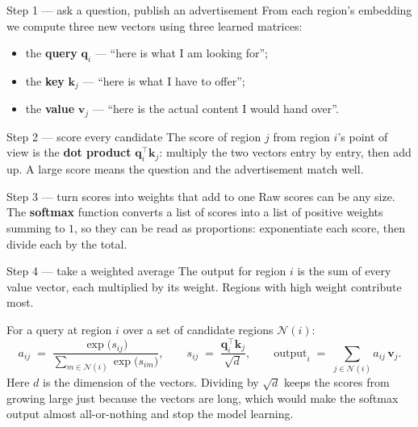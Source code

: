 \documentclass[11pt,a4paper]{article}
\newcommand{\qvec}[1]{\mathbf{q}_{#1}}
\newcommand{\kvec}[1]{\mathbf{k}_{#1}}
\newcommand{\vvec}[1]{\mathbf{v}_{#1}}
\newcommand{\term}[1]{\textcolor{deepblue}{\textbf{#1}}}
\begin{document}
\begin{stepbox}{Step 1 --- ask a question, publish an advertisement}
From each region's embedding we compute three new vectors using three learned
matrices:
\begin{itemize}
\item the \term{query} $\qvec{i}$ --- ``here is what I am looking for'';
\item the \term{key} $\kvec{j}$ --- ``here is what I have to offer'';
\item the \term{value} $\vvec{j}$ --- ``here is the actual content I would hand over''.
\end{itemize}
\end{stepbox}

\begin{stepbox}{Step 2 --- score every candidate}
The score of region $j$ from region $i$'s point of view is the \term{dot product}
$\qvec{i}^\top \kvec{j}$: multiply the two vectors entry by entry, then add up. A
large score means the question and the advertisement match well.
\end{stepbox}

\begin{stepbox}{Step 3 --- turn scores into weights that add to one}
Raw scores can be any size. The \term{softmax} function converts a list of scores
into a list of positive weights summing to $1$, so they can be read as
proportions: exponentiate each score, then divide each by the total.
\end{stepbox}

\begin{stepbox}{Step 4 --- take a weighted average}
The output for region $i$ is the sum of every value vector, each multiplied by
its weight. Regions with high weight contribute most.
\end{stepbox}

\begin{mathbox}
For a query at region $i$ over a set of candidate regions $\mathcal{N}(i)$:
\begin{equation}
a_{ij} \;=\; \frac{\exp\!\big(s_{ij}\big)}{\sum_{m \in \mathcal{N}(i)} \exp\!\big(s_{im}\big)},
\qquad
s_{ij} \;=\; \frac{\qvec{i}^\top \kvec{j}}{\sqrt{d}},
\qquad
\text{output}_i \;=\; \sum_{j \in \mathcal{N}(i)} a_{ij}\, \vvec{j}.
\label{eq:plain-attention}
\end{equation}
Here $d$ is the dimension of the vectors. Dividing by $\sqrt{d}$ keeps the scores
from growing large just because the vectors are long, which would make the
softmax output almost all-or-nothing and stop the model learning.
\end{mathbox}
\end{document}
